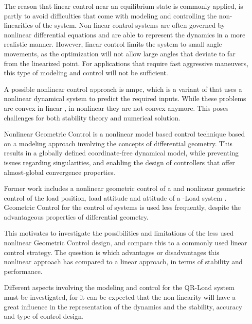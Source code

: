 The reason that linear control near an equilibrium state is commonly applied, is partly to avoid difficulties that come with modeling and controlling the non-linearities of the system. Non-linear control systems are often governed by nonlinear differential equations and are able to represent the dynamics in a more realistic manner. However, linear control limits the system to small angle movements, as the optimization will not allow large angles that deviate to far from the linearized point. For applications that require fast aggressive maneuvers, this type of modeling and control will not be sufficient.

A possible nonlinear control approach is \acs{nmpc}, which is a variant of  that uses a nonlinear dynamical system to predict the required inputs. While these problems are convex in linear , in nonlinear  they are not convex anymore. This poses challenges for both  stability theory and numerical solution.

Nonlinear Geometric Control is a nonlinear model based control technique based on a modeling approach involving the concepts of differential geometry. This results in a globally defined coordinate-free dynamical model, while preventing issues regarding singularities, and enabling the design of controllers that offer almost-global convergence properties.

Former work includes a nonlinear geometric control of a  \cite{Lee2010,Goodarzi2013a} and nonlinear geometric control of the load position, load attitude and  attitude of a -Load system \cite{Sreenath2013a,Sreenath2013b,Tang2014}.
Geometric Control for the control of  systems is used less frequently, despite the advantageous properties of differential geometry. 

This motivates to investigate the possibilities and limitations of the less used nonlinear Geometric Control design, and compare this to a commonly used linear control strategy.
The question is which advantages or disadvantages this nonlinear approach has compared to a linear approach, in terms of stability and performance.



Different aspects involving the modeling and control for the QR-Load system must be investigated, for it can be expected that the non-linearity will have a great influence in the representation of the dynamics and the stability, accuracy and type of control design.

